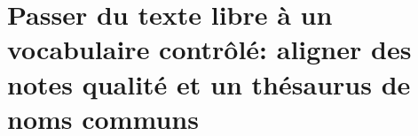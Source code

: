 \section{\label{I-C-3}Passer du texte libre à un vocabulaire contrôlé: aligner des notes qualité et un thésaurus de noms communs}
